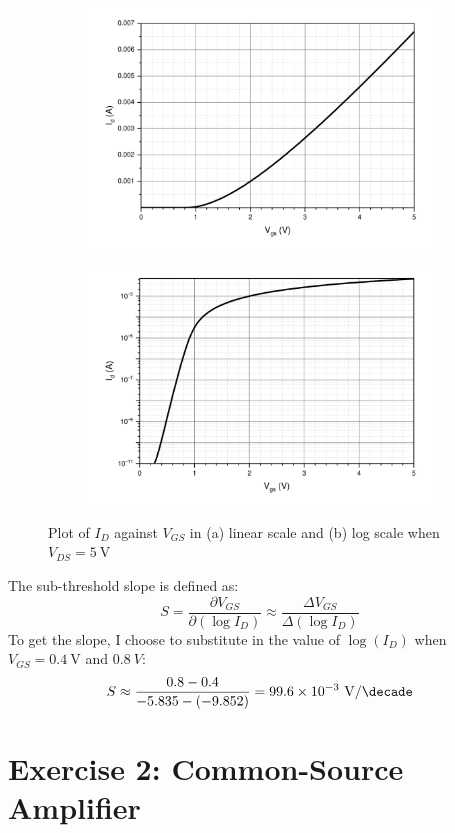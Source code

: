 \documentclass[12pt]{article}   %
\begin{document}
	\begin{figure}[htbp]
		\centering
		\begin{subfigure}{0.48\linewidth}
			\includegraphics[width=\linewidth]{Figures/E1_NMOS_Characteristic/Id_vgs_linear}
			\caption{}
			\label{fig:idVgsLinear}
		\end{subfigure}
		\begin{subfigure}{0.48\linewidth}
			\includegraphics[width=\linewidth]{Figures/E1_NMOS_Characteristic/Id_vgs_log}
			\caption{}
			\label{fig:idVgsLog}
		\end{subfigure}
		\caption{Plot of $I_{D}$ against $V_{GS}$ in (a) linear scale and (b) log scale when $V_{DS} = \SI{5}{\volt}$}
	\end{figure}
	
	The sub-threshold slope is defined as:
	\begin{equation}
		S = \frac{\partial V_{GS}}{\partial \left(\log I_D\right)} \approx \frac{\Delta V_{GS}}{\Delta \left(\log I_D\right)}
	\end{equation}
	To get the slope, I choose to substitute in the value of $\log(I_D)$ when $V_{GS} = \SI{0.4}{\volt}$ and $\SI{0.8}{V}$:
	\begin{equation}
		S \approx \frac{0.8 - 0.4}{-5.835 - \left(-9.852\right)} = 99.6 \times 10^{-3}\ \si{\volt\per\decade}
	\end{equation}
	
	\section{Exercise 2: Common-Source Amplifier}
	
	
	
\end{document}
